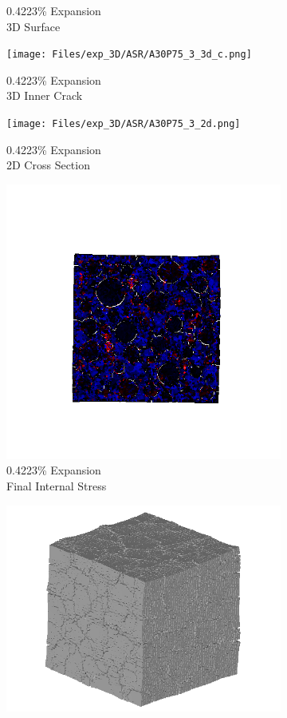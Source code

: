 \begin{figure}[ht!]
\begin{subfigure}{.25\textwidth}
      \caption{0.4223\% Expansion\\3D Surface}
    \end{subfigure}%
    \begin{subfigure}{.25\textwidth}
      \centering
      \texttt{[image: Files/exp\_3D/ASR/A30P75\_3\_3d\_c.png]}
      \caption{0.4223\% Expansion\\3D Inner Crack}
    \end{subfigure}%
    \begin{subfigure}{.25\textwidth}
      \centering
      \texttt{[image: Files/exp\_3D/ASR/A30P75\_3\_2d.png]}
      \caption{0.4223\% Expansion\\2D Cross Section}
    \end{subfigure}%
    \begin{subfigure}{.25\textwidth}
      \centering
      \includegraphics[width=.8\linewidth]{Files/exp_3D/ASR/A30P75_3_stress.png}
      \caption{0.4223\% Expansion\\Final Internal Stress}
    \end{subfigure}
    \begin{subfigure}{.25\textwidth}
      \centering
      \includegraphics[width=.8\linewidth]{Files/exp_3D/ASR/A30P75_4_3d.png}

\end{subfigure}
\end{figure}

